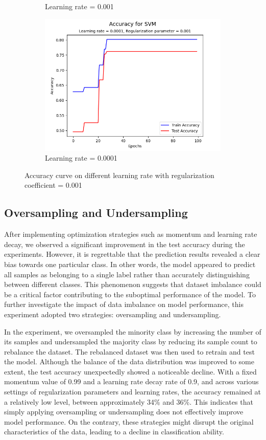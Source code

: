 \documentclass[a4paper, utf8]{ctexart}
\begin{document}
\begin{figure}[htbp]
\begin{subfigure}{.45\textwidth}
			\caption{Learning rate = 0.001}
		\end{subfigure}
		\begin{subfigure}{.45\textwidth}
			\centering
			\includegraphics[width=.9\textwidth]{./figure/myplotS10.png}
			\caption{Learning rate = 0.0001}
		\end{subfigure}
		\caption{Accuracy curve on different learning rate with regularization coefficient = 0.001}
	\end{figure}
	
	\subsection{Oversampling and Undersampling}
	
	After implementing optimization strategies such as momentum and learning rate decay, we observed a significant improvement in the test accuracy during the experiments. However, it is regrettable that the prediction results revealed a clear bias towards one particular class. In other words, the model appeared to predict all samples as belonging to a single label rather than accurately distinguishing between different classes. This phenomenon suggests that dataset imbalance could be a critical factor contributing to the suboptimal performance of the model. To further investigate the impact of data imbalance on model performance, this experiment adopted two strategies: oversampling and undersampling.
	
	In the experiment, we oversampled the minority class by increasing the number of its samples and undersampled the majority class by reducing its sample count to rebalance the dataset. The rebalanced dataset was then used to retrain and test the model. Although the balance of the data distribution was improved to some extent, the test accuracy unexpectedly showed a noticeable decline. With a fixed momentum value of 0.99 and a learning rate decay rate of 0.9, and across various settings of regularization parameters and learning rates, the accuracy remained at a relatively low level, between approximately 34\% and 36\%. This indicates that simply applying oversampling or undersampling does not effectively improve model performance. On the contrary, these strategies might disrupt the original characteristics of the data, leading to a decline in classification ability.
	
\end{document}
